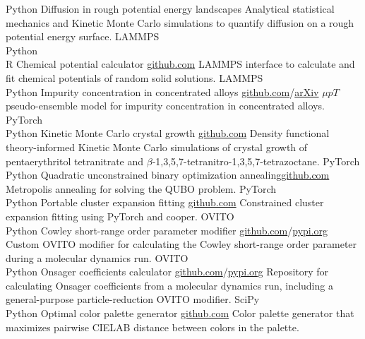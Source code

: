 \documentclass[9pt]{developercv} %
\begin{document}
\begin{entrylist}
    \entry
        {Python}
        {Diffusion in rough potential energy landscapes}
        {}
        {Analytical statistical mechanics and Kinetic Monte Carlo simulations to quantify diffusion on a rough potential energy surface.}
    \entry
        {LAMMPS \\ Python \\ R}
        {Chemical potential calculator}
        {\href{https://github.com/jwjeffr/chemical_potential_bulk}{github.com}}
        {LAMMPS interface to calculate and fit chemical potentials of random solid solutions.}
    \entry
		{LAMMPS \\ Python}
		{Impurity concentration in concentrated alloys}
        {\href{https://github.com/jwjeffr/vacancy_concentration}{github.com}/\href{https://arxiv.org/abs/2402.07324}{arXiv}}
		{$\mu pT$ pseudo-ensemble model for impurity concentration in concentrated alloys.}
    \entry
        {PyTorch \\ Python}
		{Kinetic Monte Carlo crystal growth}
        {\href{https://github.com/jwjeffr/pytorch_kmc}{github.com}}
		{Density functional theory-informed Kinetic Monte Carlo simulations of crystal growth of pentaerythritol tetranitrate and $\beta$-1,3,5,7-tetranitro-1,3,5,7-tetrazoctane.}
    \entry
		{PyTorch \\ Python}
		{Quadratic unconstrained binary optimization annealing}{\href{https://github.com/jwjeffr/pytorch_annealing}{github.com}}
		{Metropolis annealing for solving the QUBO problem.}
    \entry
		{PyTorch \\ Python}
		{Portable cluster expansion fitting}
		{\href{https://github.com/jwjeffr/cluster_expansion_pytorch}{github.com}}
		{Constrained cluster expansion fitting using PyTorch and cooper.}
    \entry
		{OVITO \\ Python}
		{Cowley short-range order parameter modifier}
		{\href{https://github.com/jwjeffr/cowley_sro_parameters}{github.com}/\href{https://pypi.org/project/cowley-sro-parameters/}{pypi.org}}
		{Custom OVITO modifier for calculating the Cowley short-range order parameter during a molecular dynamics run.}
    \entry
		{OVITO \\ Python}
		{Onsager coefficients calculator}
		{\href{https://github.com/jwjeffr/onsager_coefficients/}{github.com}/\href{https://pypi.org/project/cowley-sro-parameters/}{pypi.org}}
		{Repository for calculating Onsager coefficients from a molecular dynamics run, including a general-purpose particle-reduction OVITO modifier.}
    \entry
		{SciPy \\ Python}
		{Optimal color palette generator}
		{\href{https://github.com/jwjeffr/optcolpal}{github.com}}
		{Color palette generator that maximizes pairwise CIELAB distance between colors in the palette.}
\end{entrylist}
\end{document}
